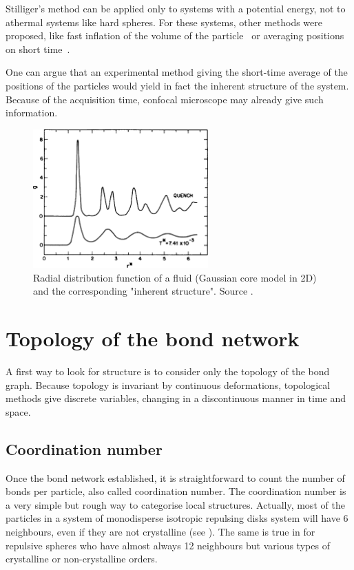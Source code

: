 Stilliger's method can be applied only to systems with a potential energy, not to athermal systems like hard spheres. For these systems, other methods were proposed, like fast inflation of the volume of the particle~\citep{Stillinger1985, berthier2009gtd} or averaging positions on short time~\citep{santen2000absence}.

One can argue that an experimental method giving the short-time average of the positions of the particles would yield in fact the inherent structure of the system. Because of the acquisition time, confocal microscope may already give such information.

\begin{figure}
	\centering
	\includegraphics[width=0.6\textwidth]{steepest_descent}
	\caption{Radial distribution function of a fluid (Gaussian core model in 2D) and the corresponding "inherent structure". Source .}
	\label{fig:inherent}
\end{figure}

\section{Topology of the bond network}

A first way to look for structure is to consider only the topology of the bond graph. Because topology is invariant by continuous deformations, topological methods give discrete variables, changing in a discontinuous manner in time and space.

\subsection{Coordination number}

Once the bond network established, it is straightforward to count the number of bonds per particle, also called coordination number. The coordination number is a very simple but rough way to categorise local structures. Actually, most of the particles in a system of monodisperse isotropic repulsing disks system will have 6 neighbours, even if they are not crystalline (see ). The same is true in for repulsive spheres who have almost always 12 neighbours but various types of crystalline or non-crystalline orders.

